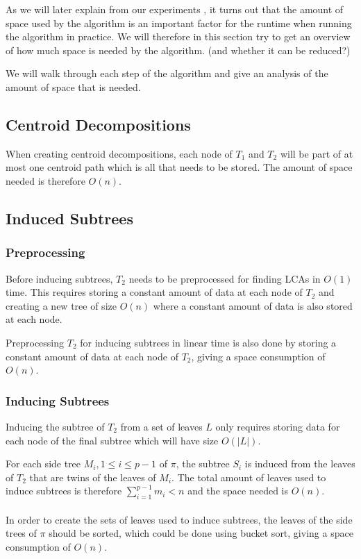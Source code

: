 As we will later explain from our experiments , it turns out that the amount of space used by the algorithm is an important factor for the runtime when running the algorithm in practice. We will therefore in this section try to get an overview of how much space is needed by the algorithm. (and whether it can be reduced?)

We will walk through each step of the algorithm and give an analysis of the amount of space that is needed.

\subsection{Centroid Decompositions}
When creating centroid decompositions, each node of $T_1$ and $T_2$ will be part of at most one centroid path which is all that needs to be stored. The amount of space needed is therefore $O(n)$.

\subsection{Induced Subtrees}
\subsubsection{Preprocessing}
Before inducing subtrees, $T_2$ needs to be preprocessed for finding LCAs in $O(1)$ time. This requires storing a constant amount of data at each node of $T_2$ and creating a new tree of size $O(n)$ where a constant amount of data is also stored at each node.

Preprocessing $T_2$ for inducing subtrees in linear time is also done by storing a constant amount of data at each node of $T_2$, giving a space consumption of $O(n)$.

\subsubsection{Inducing Subtrees}
Inducing the subtree of $T_2$ from a set of leaves $L$ only requires storing data for each node of the final subtree which will have size $O(|L|)$.

For each side tree $M_i, 1 \le i \le p-1$ of $\pi$, the subtree $S_i$ is induced from the leaves of $T_2$ that are twins of the leaves of $M_i$. The total amount of leaves used to induce subtrees is therefore $\sum_{i=1}^{p-1} m_i < n$ and the space needed is $O(n)$.
\\
\\
In order to create the sets of leaves used to induce subtrees, the leaves of the side trees of $\pi$ should be sorted, which could be done using bucket sort, giving a space consumption of $O(n)$.

